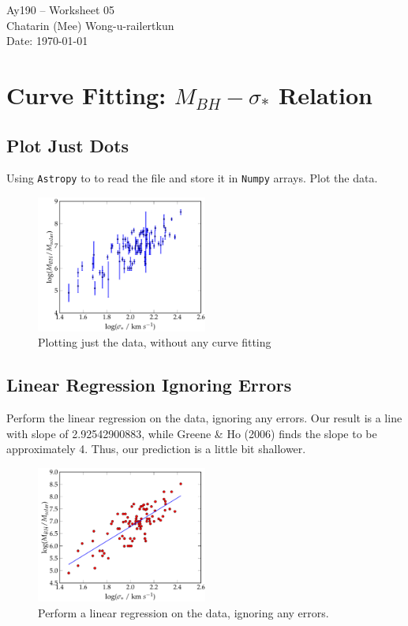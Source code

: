 \documentclass[11pt,letterpaper]{article}
\begin{document}
\begin{center}
\Large
Ay190 -- Worksheet 05 \\    %
Chatarin (Mee) Wong-u-railertkun\\
Date: \today
\end{center}

\section{Curve Fitting: $M_{BH}-\sigma_*$ Relation}

\subsection{Plot Just Dots}

Using \texttt{Astropy} to to read the file and store it in \texttt{Numpy} arrays. Plot the data.

\begin{figure}[h!]
	\centering
	\includegraphics[width=0.5\textwidth]{JustDot}
	\caption{Plotting just the data, without any curve fitting}
	\label{fig:JustDot}
\end{figure}
	 
\subsection{Linear Regression Ignoring Errors}

Perform the linear regression on the data, ignoring any errors. Our result is a line with slope of 2.92542900883, while Greene \& Ho (2006) finds the slope to be approximately 4. Thus, our prediction is a little bit shallower.

\begin{figure}[h!]
	\centering
	\includegraphics[width=0.5\textwidth]{NoError}
	\caption{Perform a linear regression on the data, ignoring any errors.}
	\label{fig:NoError}
\end{figure}
\end{document}
